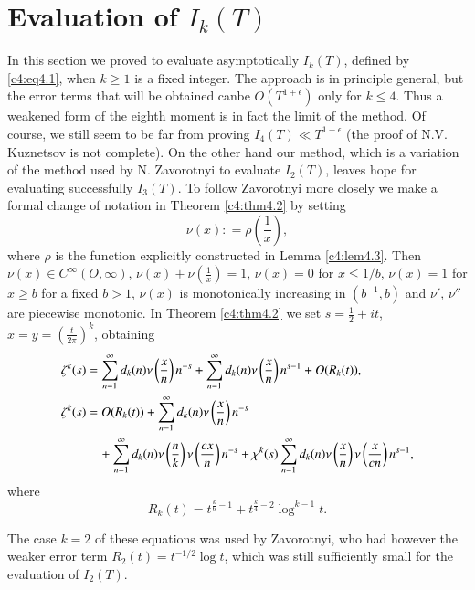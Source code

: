 \section{Evaluation of $I_k(T)$}\label{c4:sec4.3}

In this section we proved to evaluate asymptotically $I_k (T)$,
defined by \eqref{c4:eq4.1}, when $k \geq 1$ is a fixed integer. The
approach is in principle general, but the error terms that will be
obtained can\pageoriginale be $O(T^{1+ \epsilon})$ only for $k \leq
4$. Thus a weakened form of the eighth moment is in fact the limit of
the method. Of course, we still seem to be far from proving $I_4
(T)\ll T^{1+ \epsilon}$ (the proof of N.V. Kuznetsov \cite{Kuznetsov5} is not
complete). On the other hand our method, which is a variation of the
method used by N. Zavorotnyi to evaluate $I_2 (T)$, leaves hope for
evaluating successfully $I_3 (T)$. To follow Zavorotnyi more closely
we make a formal change of notation in Theorem \ref{c4:thm4.2} by
setting
$$
\nu (x) : = \rho \left(\frac{1}{x} \right),
$$
where $\rho$ is the function explicitly constructed in Lemma
\ref{c4:lem4.3}. Then $\nu (x) \in C^\infty (O, \infty)$, $\nu (x) +
\nu \left(\frac{1}{x} \right)=1$, $\nu (x) =0$ for $x \leq 1/b$, $\nu
(x)=1$ for $x \geq b$ for a fixed $b > 1$, $\nu (x)$ is monotonically
increasing in $(b^{-1} , b)$ and $\nu'$, $\nu''$ are piecewise
monotonic. In Theorem \ref{c4:thm4.2} we set $s= \frac{1}{2} + it$,
$x= y = \left(\frac{t}{2 \pi} \right)^k$, obtaining
\begin{align}
  \zeta^k(s)  &= \sum_{n=1}^\infty d_k (n) \nu \left(\frac{x}{n}\right)n^{-s} +
  \sum_{n=1}^\infty d_k (n) \nu \left(\frac{x}{n} \right)n^{s-1} + O
  (R_k (t)),\label{c4:eq4.43}\\
   \zeta^k (s)  &= O(R_k (t))+\sum_{n-1}^\infty d_k (n) \nu
  \left(\frac{x}{n}\right) n^{-s}\label{c4:eq4.44}\\
  & \quad + \sum_{n=1}^\infty d_k (n) \nu
  \left(\frac{n}{k}\right) \nu \left(\frac{cx}{n} \right) n^{-s}  + \chi^k
  (s) \sum_{n=1}^\infty d_k (n) \nu \left( \frac{x}{n}\right) \nu \left(
  \frac{x}{cn}\right) n^{s-1},\notag
\end{align}
where
\begin{equation}
 R_k (t)  = t^{\frac{k}{6}-1} + t^{\frac{k}{4}-2} \log^{k-1}
  t.\label{c4:eq4.45} 
\end{equation}

The case $k=2$ of these equations was used by Zavorotnyi, who had
however the weaker error term $R_2 (t) = t^{-1/2} \log t$, which was
still sufficiently small for the evaluation of $I_2 (T)$. 

